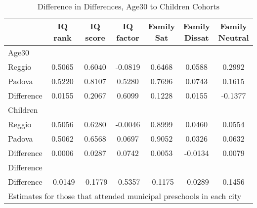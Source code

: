 \begin{table}[htbp]\centering
\caption{Difference in Differences, Age30 to Children Cohorts}
\begin{tabular}{l*{6}{c}}
\hline\hline
            &     IQ rank&    IQ score&   IQ factor&  Family Sat&Family Dissat&Family Neutral\\
\hline
Age30       &            &            &            &            &            &            \\
Reggio      &      0.5065&      0.6040&     -0.0819&      0.6468&      0.0588&      0.2992\\
Padova      &      0.5220&      0.8107&      0.5280&      0.7696&      0.0743&      0.1615\\
Difference  &      0.0155&      0.2067&      0.6099&      0.1228&      0.0155&     -0.1377\\
\hline
Children    &            &            &            &            &            &            \\
Reggio      &      0.5056&      0.6280&     -0.0046&      0.8999&      0.0460&      0.0554\\
Padova      &      0.5062&      0.6568&      0.0697&      0.9052&      0.0326&      0.0632\\
Difference  &      0.0006&      0.0287&      0.0742&      0.0053&     -0.0134&      0.0079\\
\hline
Difference  &            &            &            &            &            &            \\
Difference  &     -0.0149&     -0.1779&     -0.5357&     -0.1175&     -0.0289&      0.1456\\
\hline\hline
\multicolumn{7}{l}{\footnotesize Estimates for those that attended municipal preschools in each city}\\
\end{tabular}
\end{table}
